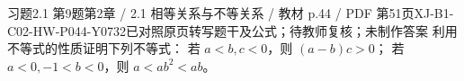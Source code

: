 \par\noindent\begin{minipage}{\linewidth}
\begin{bankitem}{习题2.1 第9题}{第2章 / 2.1 相等关系与不等关系 / 教材 p.44 / PDF 第51页}{XJ-B1-C02-HW-P044-Y0732}{已对照原页转写题干及公式；待教师复核；未制作答案}
利用不等式的性质证明下列不等式：
若 $a<b,c<0$，则 $(a-b)c>0$；
若 $a<0,-1<b<0$，则 $a<ab^2<ab$。
\end{bankitem}
\end{minipage}\par\medskip

